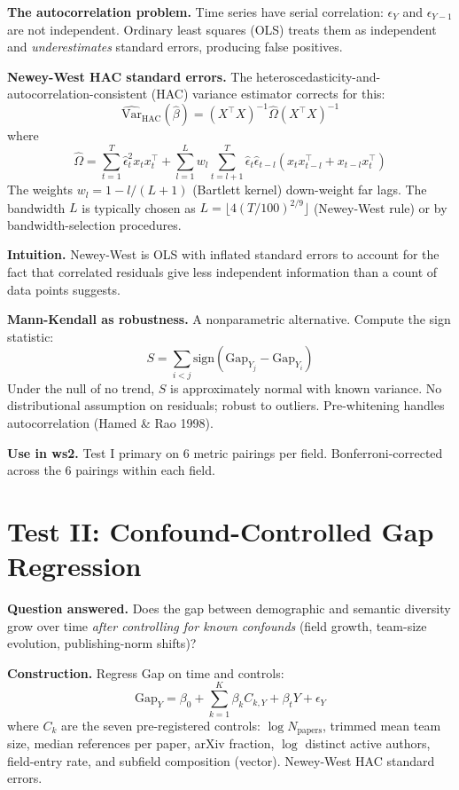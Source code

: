 \documentclass[11pt]{article}
\begin{document}
\textbf{The autocorrelation problem.} Time series have serial
correlation: $\epsilon_Y$ and $\epsilon_{Y-1}$ are not independent.
Ordinary least squares (OLS) treats them as independent and
\textit{underestimates} standard errors, producing false positives.

\textbf{Newey-West HAC standard errors.} The
heteroscedasticity-and-autocorrelation-consistent (HAC) variance
estimator corrects for this:
\[
  \widehat{\text{Var}}_{\text{HAC}}(\hat \beta) =
  (X^\top X)^{-1} \hat{\Omega} (X^\top X)^{-1}
\]
where
\[
  \hat{\Omega} = \sum_{t=1}^T \hat \epsilon_t^2 x_t x_t^\top
  + \sum_{l=1}^{L} w_l \sum_{t=l+1}^{T} \hat \epsilon_t \hat \epsilon_{t-l}
  (x_t x_{t-l}^\top + x_{t-l} x_t^\top)
\]
The weights $w_l = 1 - l/(L+1)$ (Bartlett kernel) down-weight far
lags. The bandwidth $L$ is typically chosen as $L = \lfloor
4(T/100)^{2/9} \rfloor$ (Newey-West rule) or by bandwidth-selection
procedures.

\textbf{Intuition.} Newey-West is OLS with inflated standard errors
to account for the fact that correlated residuals give less
independent information than a count of data points suggests.

\textbf{Mann-Kendall as robustness.} A nonparametric alternative.
Compute the sign statistic:
\[
  S = \sum_{i < j} \text{sign}(\text{Gap}_{Y_j} - \text{Gap}_{Y_i})
\]
Under the null of no trend, $S$ is approximately normal with known
variance. No distributional assumption on residuals; robust to
outliers. Pre-whitening handles autocorrelation (Hamed \& Rao 1998).

\textbf{Use in ws2.} Test I primary on 6 metric pairings per field.
Bonferroni-corrected across the 6 pairings within each field.

\section{Test II: Confound-Controlled Gap Regression}
\label{sec:test-ii}

\textbf{Question answered.} Does the gap between demographic and
semantic diversity grow over time \textit{after controlling for known
confounds} (field growth, team-size evolution, publishing-norm shifts)?

\textbf{Construction.} Regress Gap on time and controls:
\[
  \text{Gap}_Y = \beta_0 + \sum_{k=1}^{K} \beta_k C_{k,Y} + \beta_t Y
  + \epsilon_Y
\]
where $C_k$ are the seven pre-registered controls: $\log N_{\text{papers}}$,
trimmed mean team size, median references per paper, arXiv fraction,
$\log$ distinct active authors, field-entry rate, and subfield
composition (vector). Newey-West HAC standard errors.
\end{document}
